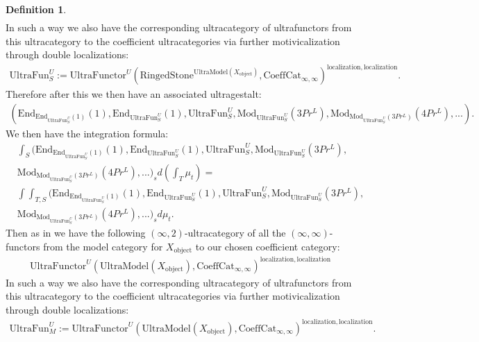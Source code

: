 \documentclass[12pt]{article}
\theoremstyle{definition}
\newtheorem{definition}{Definition}
\begin{document}
\begin{definition}
\begin{align}
\end{align}
In such a way we also have the corresponding ultracategory of ultrafunctors from this ultracategory to the coefficient ultracategories via further motivicalization through double localizations:
\begin{align}
\mathrm{UltraFun}_S^U:=\mathrm{UltraFunctor}^U(\mathrm{RingedStone}^{\mathrm{UltraModel}(X_\mathrm{object})},\mathrm{CoeffCat}_{\infty,\infty})^{\mathrm{localization}, \mathrm{localization}}.
\end{align}
Therefore after this we then have an associated ultragestalt:
\begin{align}
(\mathrm{End}_{\mathrm{End}_{\mathrm{UltraFun}_S^U}(1)}(1),\mathrm{End}_{\mathrm{UltraFun}_S^U}(1),\mathrm{UltraFun}_S^U,\mathrm{Mod}_{\mathrm{UltraFun}_S^U}(3Pr^L),\mathrm{Mod}_{\mathrm{Mod}_{\mathrm{UltraFun}_S^U}(3Pr^L)}(4Pr^L),...).
\end{align}
We then have the integration formula:
\begin{align}
&\int_S(\mathrm{End}_{\mathrm{End}_{\mathrm{UltraFun}_S^U}(1)}(1),\mathrm{End}_{\mathrm{UltraFun}_S^U}(1),\mathrm{UltraFun}_S^U,\mathrm{Mod}_{\mathrm{UltraFun}_S^U}(3Pr^L),\\
&\mathrm{Mod}_{\mathrm{Mod}_{\mathrm{UltraFun}_S^U}(3Pr^L)}(4Pr^L),...)_{s}d(\int_T \mu_t)=\\
&\int\int_{T,S}(\mathrm{End}_{\mathrm{End}_{\mathrm{UltraFun}_S^U}(1)}(1),\mathrm{End}_{\mathrm{UltraFun}_S^U}(1),\mathrm{UltraFun}_S^U,\mathrm{Mod}_{\mathrm{UltraFun}_S^U}(3Pr^L),\\
&\mathrm{Mod}_{\mathrm{Mod}_{\mathrm{UltraFun}_S^U}(3Pr^L)}(4Pr^L),...)_{s}d\mu_t.
\end{align}
Then as in \cite{5Lu3} we have the following $(\infty,2)$-ultracategory of all the $(\infty,\infty)$-functors from the model category for $X_\mathrm{object}$ to our chosen coefficient category:
\begin{align}
\mathrm{UltraFunctor}^U(\mathrm{UltraModel}(X_\mathrm{object}),\mathrm{CoeffCat}_{\infty,\infty})^{\mathrm{localization}, \mathrm{localization}}
\end{align}
In such a way we also have the corresponding ultracategory of ultrafunctors from this ultracategory to the coefficient ultracategories via further motivicalization through double localizations:
\begin{align}
\mathrm{UltraFun}_M^U:=\mathrm{UltraFunctor}^U({\mathrm{UltraModel}(X_\mathrm{object})},\mathrm{CoeffCat}_{\infty,\infty})^{\mathrm{localization}, \mathrm{localization}}.

\end{align}
\end{definition}
\end{document}
